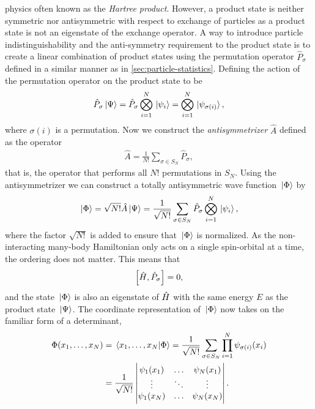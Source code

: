         physics often known as the \emph{Hartree product}.
        However, a product state is neither symmetric nor antisymmetric with
        respect to exchange of particles as a product state is not an eigenstate
        of the exchange operator.
        A way to introduce particle indistinguishability and the anti-symmetry
        requirement to the product state is to create a linear combination of
        product states using the permutation operator $\hat{P}_{\sigma}$ defined
        in a similar manner as in \autoref{sec:particle-statistics}.
        Defining the action of the permutation operator on the product state to
        be
        \begin{align}
            \hat{P}_{\sigma}\ket*{\Psi}
            = \hat{P}_{\sigma}\bigotimes_{i = 1}^{N}\ket*{\psi_i}
            = \bigotimes_{i = 1}^{N}\ket*{\psi_{\sigma(i)}},
        \end{align}
        where $\sigma(i)$ is a permutation.
        Now we construct the \emph{antisymmetrizer} $\hat{A}$ defined as the
        operator
        \begin{align}
            \hat{A} = \frac{1}{N!}\sum_{\sigma \in S_{N}}\hat{P}_{\sigma},
        \end{align}
        that is, the operator that performs all $N!$ permutations in $S_{N}$.
        Using the antisymmetrizer we can construct a totally antisymmetric wave
        function $\ket*{\Phi}$ by
        \begin{align}
            \ket*{\Phi}
            = \sqrt{N!}\hat{A}\ket*{\Psi}
            = \frac{1}{\sqrt{N!}}\sum_{\sigma \in S_{N}}
            \hat{P}_{\sigma}
            \bigotimes_{i = 1}^{N}\ket*{\psi_i},
            \label{eq:slater-determinant-abstract}
        \end{align}
        where the factor $\sqrt{N!}$ is added to ensure that $\ket*{\Phi}$ is
        normalized.
        As the non-interacting many-body Hamiltonian only acts on a single
        spin-orbital at a time, the ordering does not matter.
        This means that
        \begin{align}
            \left[\hat{H}, \hat{P}_{\sigma}\right] = 0,
        \end{align}
        and the state $\ket*{\Phi}$ is also an eigenstate of $\hat{H}$ with the
        same energy $E$ as the product state $\ket*{\Psi}$.
        The coordinate representation of $\ket*{\Phi}$ now takes on the familiar
        form of a determinant,
        \begin{align}
            \Phi(x_1, \dots, x_N)
            &=
            \braket*{x_1, \dots, x_N}{\Phi}
            = \frac{1}{\sqrt{N!}}
            \sum_{\sigma \in S_{N}}
            \prod_{i = 1}^{N}
            \psi_{\sigma(i)}(x_i)
            \\
            &=
            \frac{1}{\sqrt{N!}}
            \begin{vmatrix}
                \psi_1(x_1) & \dots & \psi_N(x_1) \\
                \vdots & \ddots & \vdots \\
                \psi_1(x_N) & \dots & \psi_N(x_N)
            \end{vmatrix}.
            \label{eq:coord_slater}
        \end{align}
